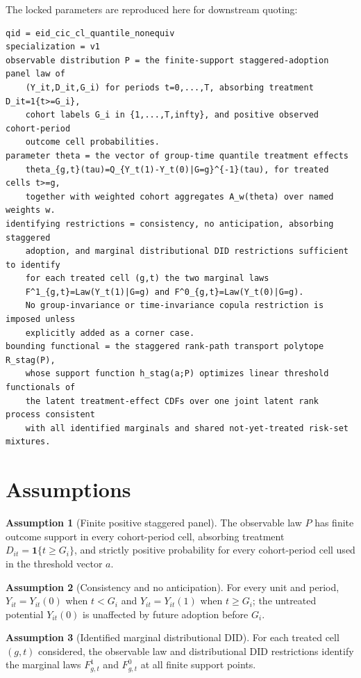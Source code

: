 \documentclass[11pt]{article}
\newcommand{\one}{\mathbf{1}}
\theoremstyle{definition}
\newtheorem{assumption}{Assumption}
\theoremstyle{plain}
\theoremstyle{remark}
\begin{document}
The locked parameters are reproduced here for downstream quoting:
\begin{verbatim}
qid = eid_cic_cl_quantile_nonequiv
specialization = v1
observable distribution P = the finite-support staggered-adoption panel law of
    (Y_it,D_it,G_i) for periods t=0,...,T, absorbing treatment D_it=1{t>=G_i},
    cohort labels G_i in {1,...,T,infty}, and positive observed cohort-period
    outcome cell probabilities.
parameter theta = the vector of group-time quantile treatment effects
    theta_{g,t}(tau)=Q_{Y_t(1)-Y_t(0)|G=g}^{-1}(tau), for treated cells t>=g,
    together with weighted cohort aggregates A_w(theta) over named weights w.
identifying restrictions = consistency, no anticipation, absorbing staggered
    adoption, and marginal distributional DID restrictions sufficient to identify
    for each treated cell (g,t) the two marginal laws
    F^1_{g,t}=Law(Y_t(1)|G=g) and F^0_{g,t}=Law(Y_t(0)|G=g).
    No group-invariance or time-invariance copula restriction is imposed unless
    explicitly added as a corner case.
bounding functional = the staggered rank-path transport polytope R_stag(P),
    whose support function h_stag(a;P) optimizes linear threshold functionals of
    the latent treatment-effect CDFs over one joint latent rank process consistent
    with all identified marginals and shared not-yet-treated risk-set mixtures.
\end{verbatim}

\section{Assumptions}
\begin{assumption}[Finite positive staggered panel]\label{ass:finite-panel}
The observable law \(P\) has finite outcome support in every cohort-period cell, absorbing treatment \(D_{it}=\one\{t\ge G_i\}\), and strictly positive probability for every cohort-period cell used in the threshold vector \(a\).
\end{assumption}

\begin{assumption}[Consistency and no anticipation]\label{ass:consistency}
For every unit and period, \(Y_{it}=Y_{it}(0)\) when \(t<G_i\) and \(Y_{it}=Y_{it}(1)\) when \(t\ge G_i\); the untreated potential \(Y_{it}(0)\) is unaffected by future adoption before \(G_i\).
\end{assumption}

\begin{assumption}[Identified marginal distributional DID]\label{ass:marginal-did}
For each treated cell \((g,t)\) considered, the observable law and distributional DID restrictions identify the marginal laws \(F^1_{g,t}\) and \(F^0_{g,t}\) at all finite support points.
\end{assumption}
\end{document}
